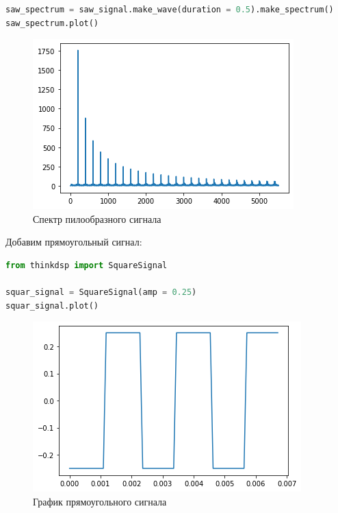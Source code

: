 \begin{lstlisting}[language=Python]
saw_spectrum = saw_signal.make_wave(duration = 0.5).make_spectrum()
saw_spectrum.plot()
\end{lstlisting}

\begin{figure}[H]
	\begin{center}
		\includegraphics[scale=1]{fig/lab02/lab02_7_0.png}
		\caption{Спектр пилообразного сигнала}
	\end{center}
\end{figure}

Добавим прямоугольный сигнал:

\begin{lstlisting}[language=Python]
from thinkdsp import SquareSignal

squar_signal = SquareSignal(amp = 0.25)
squar_signal.plot()
\end{lstlisting}

\begin{figure}[H]
	\begin{center}
		\includegraphics[scale=1]{fig/lab02/lab02_9_0.png}
		\caption{График прямоугольного сигнала}
	\end{center}
\end{figure}

